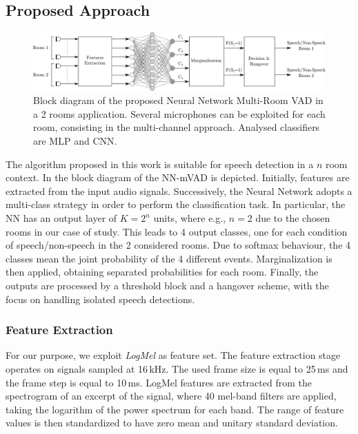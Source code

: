 \subsection{Proposed Approach}
\begin{figure}[h]
	\centering
	\includegraphics[width=\textwidth]{img/flowchart_VAD}
	\caption[Multiroom VAD with 3-D CNNs]{Block diagram of the proposed Neural Network Multi-Room VAD in a 2 rooms application. 
		Several microphones can be exploited for each room, consisting in the multi-channel approach. Analysed classifiers are MLP and CNN.}
	\label{fig:VAD}
\end{figure}

The algorithm proposed in this work is suitable for speech detection in a $n$ room context. 
In  the block diagram of the NN-mVAD is depicted. 
Initially, features are extracted from the input audio signals. 
Successively, the Neural Network adopts a multi-class strategy in order to perform the classification task. In particular, the NN has an output layer of $K=2^{n}$ units,
where e.g., $n=2$ due to the chosen rooms in our case of study. This leads to 4 output classes, one for each condition of speech/non-speech in the 2 considered rooms. Due to softmax behaviour, the 4 classes mean the joint probability of the 4 different events.
Marginalization is then applied, obtaining separated probabilities for each room. Finally, the outputs are processed by a threshold block and a hangover scheme, with the focus on handling isolated speech detections.

\subsubsection{Feature Extraction}
\label{ssec:feat_desc}
For our purpose, we exploit \textit{LogMel} as feature set.
The feature extraction stage operates on signals sampled at 16\,kHz. The used frame size is equal to 25\,ms and the frame step is equal to 10\,ms. LogMel features are extracted from the spectrogram of an excerpt of the signal, where 40 mel-band filters are applied, taking the logarithm of the power spectrum for each band. The range of feature values is then standardized to have zero mean and unitary standard deviation.


